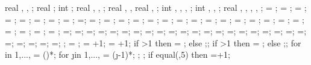 {{real \shearwallstartx, \shearwallstarty \shearwalldeltax, \shearwalldeltay;
real \shearwalllinet;
int \showmarksuper;
real \marksuperexspace, \marksuperrad, \marksuperlinet;
real \marksuperleftstartx, \marksuperleftstarty,
real \marksuperdeltax, \marksuperdeltay;
int \leftstory, \leftlevel, \rightstory, \rightlevel;
int \leftopenstory, \rightopenstory, \showopenstory;
real \leftwallh, \leftopenh, \rightwallh, \rightopenh, \diffwallh;
\storyheight = \storyheight;
\baywidth = \baywidth;
\startx = \startx;
\starty = \starty;
\supportwidth = \supportwidth;
\supportheight = \supportheight;
\isolationwidth = \isolationwidth;
\isolationdepth = \isolationdepth;
\isoshift=\isoshift;
\foundationdepth = \foundationdepth;
\linet = \linet;
\beamlinet = \beamlinet;
\collinet = \collinet;
\baselinet = \baselinet;
\isolinet = \isolinet;
\massrad = \massrad;
\foundsidew = \foundsidew;
\leftsoildist = \leftsoildist;
\rightsoildist = \rightsoildist;
\leftsoildepth = \leftsoildepth;
\rightsoildepth = \rightsoildepth;
\soilbelowfound = \soilbelowfound;
\leftcontrolx = \leftcontrolx;
\leftcontroly = \leftcontroly;
\rightcontrolx = \rightcontrolx;
\rightcontroly = \rightcontroly;
\axeslenX = \axeslenX;
\axeslenY = \axeslenY;
\piledepth=\piledepth;
\pilesidespace=\pilesidespace;
\pilediameter=\pilediameter;
\pilelinethickness=\pilelinethickness;
\pblinet=\pblinet;
\latloadshift=\latloadshift;
\toparrlen=\toparrlen;
\basearrlen=\basearrlen;
\drift=\drift;
=;
=;
=;
\engbedrockdepth=\engbedrockdepth;
\engbedrockleftdist=\engbedrockleftdist;
\engbedrockrightdist=\engbedrockrightdist;
\engbedrocklinewidth=\engbedrocklinewidth;
\translayerlinet=\translayerlinet;
\ssinterlinet=\ssinterlinet;
\markssexspace=\markssexspace;
\markssrad=\markssrad;
\marksslinet=\marksslinet;
\supershadespace=\supershadespace;
\shearwalllinet=\shearwalllinet;
\marksuperexspace=\marksuperexspace;
\marksuperrad=\marksuperrad;
\marksuperlinet=\marksuperlinet;
;
\storyminone = ;
\columnnumber = \baynumber+1; %
\levelnumber = \storynumber+1; %
if \storynumber>1 then {\nlevmo = ;} else {;};
if \baynumber>1 then {\ncolmo = ;} else {;};
for \iii in {1,...,{\levelnumber}}{
\y{\iii} = ()*\storyheight;
for \j in {1,...,{\columnnumber}}{
\x{\j} = (\j-1)*\baywidth;
};
};
if equal(\showsupports,5) then
{=\subfloors+1;
}}}
